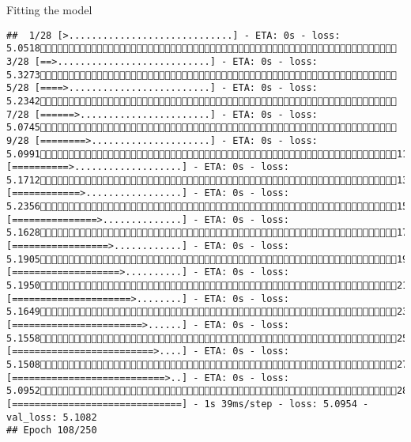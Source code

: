 \documentclass[
  ignorenonframetext,
]{beamer}
\begin{document}
\begin{frame}[fragile]{Fitting the model}
\begin{verbatim}
##  1/28 [>.............................] - ETA: 0s - loss: 5.0518 3/28 [==>...........................] - ETA: 0s - loss: 5.3273 5/28 [====>.........................] - ETA: 0s - loss: 5.2342 7/28 [======>.......................] - ETA: 0s - loss: 5.0745 9/28 [========>.....................] - ETA: 0s - loss: 5.099111/28 [==========>...................] - ETA: 0s - loss: 5.171213/28 [============>.................] - ETA: 0s - loss: 5.235615/28 [===============>..............] - ETA: 0s - loss: 5.162817/28 [=================>............] - ETA: 0s - loss: 5.190519/28 [===================>..........] - ETA: 0s - loss: 5.195021/28 [=====================>........] - ETA: 0s - loss: 5.164923/28 [=======================>......] - ETA: 0s - loss: 5.155825/28 [=========================>....] - ETA: 0s - loss: 5.150827/28 [===========================>..] - ETA: 0s - loss: 5.095228/28 [==============================] - 1s 39ms/step - loss: 5.0954 - val_loss: 5.1082
## Epoch 108/250

\end{verbatim}
\end{frame}
\end{document}
